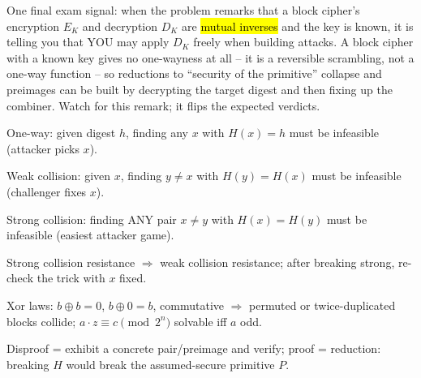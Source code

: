 \documentclass[12pt, a4paper]{article}
\newcommand{\imp}[1]{\hl{#1}}                       %
\begin{document}
One final exam signal: when the problem remarks that a block cipher's encryption $E_K$ and decryption $D_K$ are \imp{mutual inverses} and the key is known, it is telling you that YOU may apply $D_K$ freely when building attacks. A block cipher with a known key gives no one-wayness at all -- it is a reversible scrambling, not a one-way function -- so reductions to ``security of the primitive'' collapse and preimages can be built by decrypting the target digest and then fixing up the combiner. Watch for this remark; it flips the expected verdicts.

\begin{theorybox}
\begin{tightitem}
    \item One-way: given digest $h$, finding any $x$ with $H(x)=h$ must be infeasible (attacker picks $x$).
    \item Weak collision: given $x$, finding $y \neq x$ with $H(y)=H(x)$ must be infeasible (challenger fixes $x$).
    \item Strong collision: finding ANY pair $x \neq y$ with $H(x)=H(y)$ must be infeasible (easiest attacker game).
    \item Strong collision resistance $\Rightarrow$ weak collision resistance; after breaking strong, re-check the trick with $x$ fixed.
    \item Xor laws: $b \oplus b = 0$, $b \oplus 0 = b$, commutative $\Rightarrow$ permuted or twice-duplicated blocks collide; $a \cdot z \equiv c \pmod{2^n}$ solvable iff $a$ odd.
    \item Disproof = exhibit a concrete pair/preimage and verify; proof = reduction: breaking $H$ would break the assumed-secure primitive $P$.
\end{tightitem}
\end{theorybox}
\end{document}

